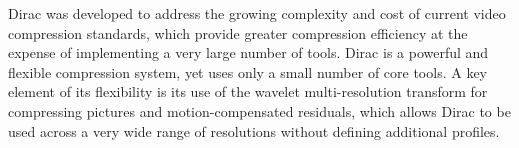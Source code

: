 
Dirac was developed to address the growing complexity and cost of current video
compression standards, which provide greater compression efficiency
at the expense of implementing a very large number of tools. Dirac is
a powerful and flexible compression system, yet uses only a small number
of core tools. A key element of its flexibility is its use of the wavelet
multi-resolution transform for compressing pictures and motion-compensated 
residuals, which allows Dirac to be used across a very wide range of resolutions
without defining additional profiles.



